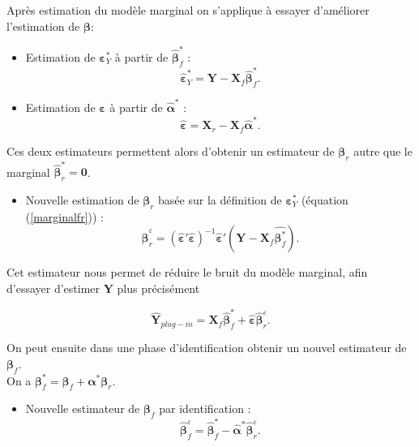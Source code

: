 \documentclass[12pt,a4paper]{report}
\begin{document}
Après estimation du modèle marginal on s'applique à essayer d'améliorer l'estimation de $\boldsymbol{\beta}$: 
\begin{itemize}
	\item Estimation de  $\boldsymbol{\varepsilon}_Y^*$ à partir de $\hat{\boldsymbol{\beta}}^*_f$ :
	\begin{equation}
		\hat{\boldsymbol{\varepsilon}}_Y^*=\boldsymbol{Y}-\boldsymbol{X}_f\hat{\boldsymbol{\beta}}^*_f. \nonumber 
	\end{equation}
	\item Estimation de $\boldsymbol{\varepsilon}$ à partir de $\hat{\boldsymbol{\alpha}}^*$ :
	\begin{equation}
		\hat{\boldsymbol{\varepsilon}}=\boldsymbol{X}_r-\boldsymbol{X}_f\hat{\boldsymbol{\alpha}}^* .\label{epsilonchapeaufr}
	\end{equation}
\end{itemize}
Ces deux estimateurs permettent alors d'obtenir un estimateur de $\boldsymbol{\beta}_r$ autre que le marginal $\hat{\boldsymbol{\beta}}^*_r=\boldsymbol{0}$.
\begin{itemize}
	\item Nouvelle estimation de $\boldsymbol{\beta}_r$ basée sur la définition de $\boldsymbol{\varepsilon}_Y^* $ (équation (\ref{marginalfr})) :
	\begin{equation}
		\hat{\boldsymbol{\beta}}_r^{\varepsilon}=(\hat{\boldsymbol{\varepsilon}}'\hat{\boldsymbol{\varepsilon}})^{-1}\hat{\boldsymbol{\varepsilon}}'(\boldsymbol{Y}- \boldsymbol{X}_f\hat{\boldsymbol{\beta}^*_f}). \nonumber 
	\end{equation}
\end{itemize}
Cet estimateur nous permet de réduire le bruit du modèle marginal, afin d'essayer d'estimer  $\boldsymbol{Y} $ plus précisément

\begin{equation}
	\hat{\boldsymbol{Y}}_{plug-in}=\boldsymbol{X}_f\hat{\boldsymbol{\beta}}^*_f + \hat{\boldsymbol{\varepsilon}}\hat{\boldsymbol{\beta}}_{r}^{\varepsilon}. \nonumber 
\end{equation}

		On peut ensuite dans une phase d'identification obtenir un nouvel estimateur de $\boldsymbol{\beta}_f$.\\On a $\boldsymbol{\beta}^*_f=\boldsymbol{\beta}_f+\boldsymbol{\alpha}^*\boldsymbol{\beta}_r $.
		\begin{itemize}
			\item Nouvelle estimateur de $\boldsymbol{\beta}_f $ par identification :
			\begin{equation}
			\hat{\boldsymbol{\beta}}_f^{\varepsilon}=\hat{\boldsymbol{\beta}}^*_f-\hat{\boldsymbol{\alpha}}^*\hat{\boldsymbol{\beta}}_{r}^{\varepsilon}. \nonumber 
			\end{equation}
		\end{itemize}
	
\end{document}
